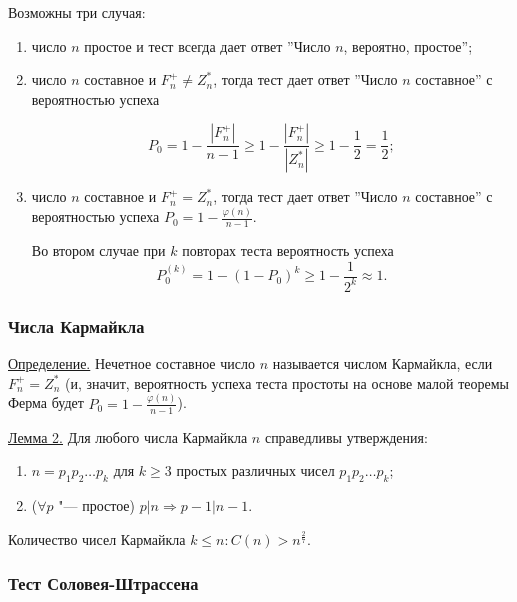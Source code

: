\documentclass[bachelor, och, labwork]{shiza}
\begin{document}
            Возможны три случая:

            \begin{enumerate}
                \item число $n$ простое и тест всегда дает ответ ''Число $n$,
                вероятно, простое'';
                \item число $n$ составное и $F^+_n \neq Z^*_n$, тогда тест дает
                ответ ''Число $n$ составное'' с вероятностью успеха

                $$P_0 = 1 - \frac{|F^+_n|}{n - 1} \geq 1 - \frac{|F^+_n|}{|Z^*_n|}
                \geq 1 - \frac{1}{2} = \frac{1}{2};$$

                \item число $n$ составное и $F^+_n = Z^*_n$, тогда тест дает ответ
                ''Число $n$ составное'' с вероятностью успеха $P_0 = 1 -
                \frac{\varphi(n)}{n - 1}.$

                Во втором случае при $k$ повторах теста вероятность успеха
                $$P_0^{(k)} = 1 - (1 - P_0)^k \geq 1 - \frac{1}{2^k} \approx 1.$$ 
            \end{enumerate}

        \subsubsection{Числа Кармайкла}

            \underline{Определение.} Нечетное составное число $n$ называется
            числом Кармайкла, если $F^+_n = Z^*_n$ (и, значит, вероятность
            успеха теста простоты на основе малой теоремы Ферма будет $P_0 = 1 -
            \frac{\varphi(n)}{n - 1}$).

            \underline{Лемма 2.} Для любого числа Кармайкла $n$ справедливы
            утверждения:

            \begin{enumerate}
                \item $n = p_1 p_2 \dots p_k$ для $k \geq 3$ простых различных
                чисел $p_1 p_2 \dots p_k$;
                \item ($\forall p$ "--- простое) $p | n \Rightarrow p - 1 | n - 1.$
            \end{enumerate}

            Количество чисел Кармайкла $k \leq n: C(n) > n^{\frac{2}{7}}.$

        \subsubsection{Тест Соловея-Штрассена}
\end{document}
